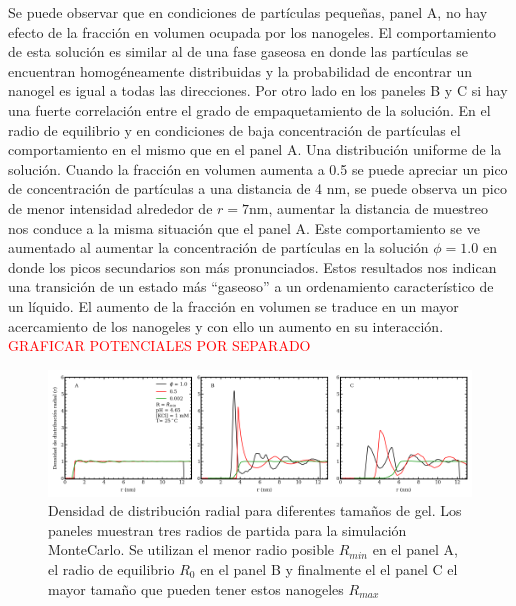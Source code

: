 Se puede observar que en condiciones de part\'iculas peque\~nas, panel A, no hay efecto de la fracci\'on en volumen ocupada por los nanogeles. El comportamiento de esta soluci\'on es similar al de una fase gaseosa en donde las part\'iculas se encuentran homog\'eneamente distribuidas y la probabilidad de encontrar un nanogel es igual a todas las direcciones.
Por otro lado en los paneles B y C si hay una fuerte correlaci\'on entre el grado de empaquetamiento de la soluci\'on.
En el radio de equilibrio y en condiciones de baja concentraci\'on de part\'iculas el comportamiento en el mismo que en el panel A. Una distribuci\'on uniforme de la soluci\'on. Cuando la fracci\'on en volumen aumenta a 0.5 se puede apreciar un pico de concentraci\'on de part\'iculas a una distancia de 4 nm, se puede observa un pico de menor intensidad alrededor de $r = 7$nm, aumentar la distancia de muestreo nos conduce a la misma situaci\'on que el panel A.
Este comportamiento se ve aumentado al aumentar la concentraci\'on de part\'iculas en la soluci\'on $\phi = 1.0$ en donde los picos secundarios son más pronunciados.
Estos resultados nos indican una transici\'on de un estado m\'as ``gaseoso'' a un ordenamiento caracter\'istico de un l\'iquido. 
El aumento de la fracci\'on en volumen se traduce en un mayor acercamiento de los nanogeles y con ello un aumento en su interacci\'on. 
\textcolor{red}{GRAFICAR POTENCIALES POR SEPARADO}


\begin{figure}[!tb]
	\centering
	\includegraphics[width=1\linewidth]{Figures/graph-mc/rdf-gels.pdf}
	\caption{Densidad de distribuci\'on radial para diferentes tama\~nos de gel. Los paneles muestran tres radios de partida para la simulaci\'on MonteCarlo. Se utilizan el menor radio posible $R_{min}$ en el panel A, el radio de equilibrio $R_0$ en el panel B y finalmente el el panel C el mayor tama\~no que pueden tener estos nanogeles $R_{max}$}
	\label{fig:mc:redf-gels-r}
\end{figure}
